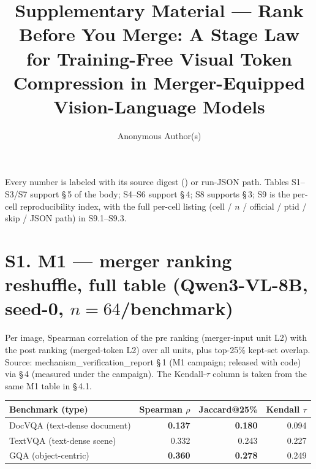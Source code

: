 \documentclass[sigconf,review,anonymous]{acmart}
\begin{document}
\title{Supplementary Material --- Rank Before You Merge: A Stage Law for
  Training-Free Visual Token Compression in Merger-Equipped Vision-Language
  Models}

\author{Anonymous Author(s)}

\maketitle

\noindent\footnotesize Every number is labeled with its source digest
() or run-JSON path. Tables S1--S3/S7 support
\S\,5 of the body; S4--S6 support \S\,4; S8
supports \S\,3; S9 is the per-cell reproducibility index, with the full
per-cell listing (cell / $n$ / official / ptid / skip / JSON path) in
S9.1--S9.3.

\section*{S1. M1 --- merger ranking reshuffle, full table (Qwen3-VL-8B, seed-0, $n = 64$/benchmark)}

Per image, Spearman correlation of the pre ranking (merger-input unit L2) with
the post ranking (merged-token L2) over all units, plus top-25\% kept-set
overlap. Source: mechanism\_verification\_report \S\,1 (M1 campaign; released
with code) via  \S\,4 (measured under the
 campaign). The Kendall-$\tau$
column is taken from the same M1 table in  \S\,4.1.

\begin{table}[h]
  \centering
  \small
  \begin{tabular}{@{}l r r r@{}}
    \toprule
    Benchmark (type) & Spearman $\rho$ & Jaccard@25\% & Kendall $\tau$ \\
    \midrule
    DocVQA (text-dense document) & \textbf{0.137} & \textbf{0.180} & 0.094 \\
    TextVQA (text-dense scene)   & 0.332          & 0.243          & 0.227 \\
    GQA (object-centric)         & \textbf{0.360} & \textbf{0.278} & 0.249 \\
    \bottomrule
  \end{tabular}
\end{table}
\end{document}
